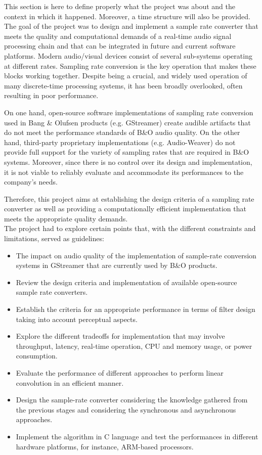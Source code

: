 This section is here to define properly what the project was about and the context in which it happened. Moreover, a time structure will also be provided.\\

The goal of the project was to design and implement a sample rate converter that meets the quality and computational demands of a real-time audio signal processing chain and that can be integrated in future and current software platforms. Modern audio/visual devices consist of several sub-systems operating at different rates. Sampling rate conversion is the key operation that makes these blocks working together. Despite being a crucial, and widely used operation of many discrete-time processing systems, it has been broadly overlooked, often resulting in poor performance. 

On one hand, open-source software implementations of sampling rate conversion used in Bang \& Olufsen products (e.g. GStreamer) create audible artifacts that do not meet the performance standards of B\&O audio quality. On the other hand, third-party proprietary implementations (e.g. Audio-Weaver) do not provide full support for the variety of sampling rates that are required in B\&O systems. Moreover, since there is no control over its design and implementation, it is not viable to reliably evaluate and accommodate its performances to the company's needs.

Therefore, this project aims at establishing the design criteria of a sampling rate converter as well as providing a computationally efficient implementation that meets the appropriate quality demands. \\

The project had to explore certain points that, with the different constraints and limitations, served as guidelines: 

\begin{itemize}
	\item The impact on audio quality of the implementation of sample-rate conversion systems in GStreamer that are currently used by B\&O products. 
	\item Review the design criteria and implementation of available open-source sample rate converters.
	\item Establish the criteria for an appropriate performance in terms of filter design taking into account perceptual aspects. 
	\item Explore the different tradeoffs for implementation that may involve throughput, latency, real-time operation, CPU and memory usage, or power consumption. 
	\item Evaluate the performance of different approaches to perform linear convolution in an efficient manner.
	\item Design the sample-rate converter considering the knowledge gathered from the previous stages and considering the synchronous and asynchronous approaches.
	\item Implement the algorithm in C language and test the performances in different hardware platforms, for instance, ARM-based processors.
	
 
\end{itemize}

